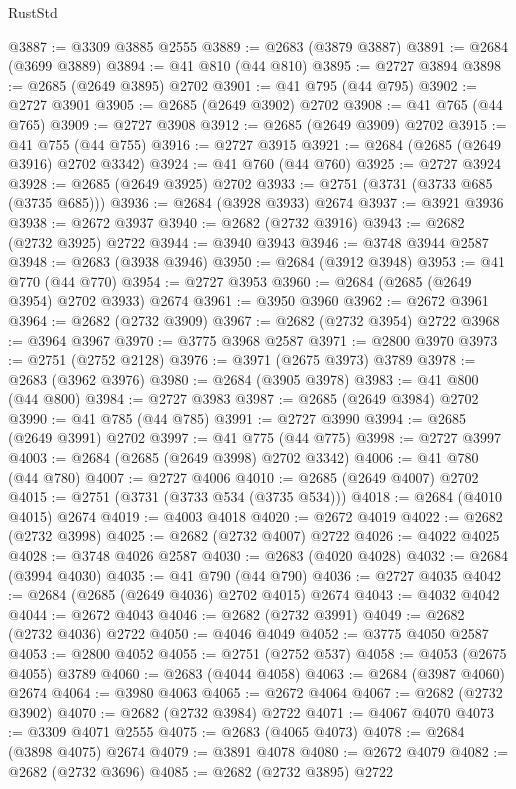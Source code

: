 \begin{lexlean}{RustStd}
\begin{coremodule}
{\begin{coremodule}
{{{{{{{{{{{{{{{{{{{{{{{{{{@3887 := @3309 @3885 @2555
@3889 := @2683 (@3879 @3887)
@3891 := @2684 (@3699 @3889)
@3894 := @41 @810 (@44 @810)
@3895 := @2727 @3894
@3898 := @2685 (@2649 @3895) @2702
@3901 := @41 @795 (@44 @795)
@3902 := @2727 @3901
@3905 := @2685 (@2649 @3902) @2702
@3908 := @41 @765 (@44 @765)
@3909 := @2727 @3908
@3912 := @2685 (@2649 @3909) @2702
@3915 := @41 @755 (@44 @755)
@3916 := @2727 @3915
@3921 := @2684 (@2685 (@2649 @3916) @2702 @3342)
@3924 := @41 @760 (@44 @760)
@3925 := @2727 @3924
@3928 := @2685 (@2649 @3925) @2702
@3933 := @2751 (@3731 (@3733 @685 (@3735 @685)))
@3936 := @2684 (@3928 @3933) @2674
@3937 := @3921 @3936
@3938 := @2672 @3937
@3940 := @2682 (@2732 @3916)
@3943 := @2682 (@2732 @3925) @2722
@3944 := @3940 @3943
@3946 := @3748 @3944 @2587
@3948 := @2683 (@3938 @3946)
@3950 := @2684 (@3912 @3948)
@3953 := @41 @770 (@44 @770)
@3954 := @2727 @3953
@3960 := @2684 (@2685 (@2649 @3954) @2702 @3933) @2674
@3961 := @3950 @3960
@3962 := @2672 @3961
@3964 := @2682 (@2732 @3909)
@3967 := @2682 (@2732 @3954) @2722
@3968 := @3964 @3967
@3970 := @3775 @3968 @2587
@3971 := @2800 @3970
@3973 := @2751 (@2752 @2128)
@3976 := @3971 (@2675 @3973) @3789
@3978 := @2683 (@3962 @3976)
@3980 := @2684 (@3905 @3978)
@3983 := @41 @800 (@44 @800)
@3984 := @2727 @3983
@3987 := @2685 (@2649 @3984) @2702
@3990 := @41 @785 (@44 @785)
@3991 := @2727 @3990
@3994 := @2685 (@2649 @3991) @2702
@3997 := @41 @775 (@44 @775)
@3998 := @2727 @3997
@4003 := @2684 (@2685 (@2649 @3998) @2702 @3342)
@4006 := @41 @780 (@44 @780)
@4007 := @2727 @4006
@4010 := @2685 (@2649 @4007) @2702
@4015 := @2751 (@3731 (@3733 @534 (@3735 @534)))
@4018 := @2684 (@4010 @4015) @2674
@4019 := @4003 @4018
@4020 := @2672 @4019
@4022 := @2682 (@2732 @3998)
@4025 := @2682 (@2732 @4007) @2722
@4026 := @4022 @4025
@4028 := @3748 @4026 @2587
@4030 := @2683 (@4020 @4028)
@4032 := @2684 (@3994 @4030)
@4035 := @41 @790 (@44 @790)
@4036 := @2727 @4035
@4042 := @2684 (@2685 (@2649 @4036) @2702 @4015) @2674
@4043 := @4032 @4042
@4044 := @2672 @4043
@4046 := @2682 (@2732 @3991)
@4049 := @2682 (@2732 @4036) @2722
@4050 := @4046 @4049
@4052 := @3775 @4050 @2587
@4053 := @2800 @4052
@4055 := @2751 (@2752 @537)
@4058 := @4053 (@2675 @4055) @3789
@4060 := @2683 (@4044 @4058)
@4063 := @2684 (@3987 @4060) @2674
@4064 := @3980 @4063
@4065 := @2672 @4064
@4067 := @2682 (@2732 @3902)
@4070 := @2682 (@2732 @3984) @2722
@4071 := @4067 @4070
@4073 := @3309 @4071 @2555
@4075 := @2683 (@4065 @4073)
@4078 := @2684 (@3898 @4075) @2674
@4079 := @3891 @4078
@4080 := @2672 @4079
@4082 := @2682 (@2732 @3696)
@4085 := @2682 (@2732 @3895) @2722
}}}}}}}}}}}}}}}}}}}}}}}}}}
\end{coremodule}}
\end{coremodule}
\end{lexlean}
